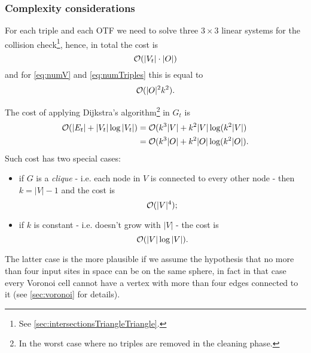 \documentclass[dissertation.tex]{subfiles}
\begin{document}
\subsubsection{Complexity considerations}
For each triple and each \ac{OTF} we need to solve three $3\times 3$
linear systems for the
collision check\footnote{See
  \cref{sec:intersectionsTriangleTriangle}.}, hence, in total
the cost is
\begin{equation*}
  \mathcal{O}(|V_t|\cdot |O|)
\end{equation*}
and for \cref{eq:numV} and \cref{eq:numTriples} this is equal to
\newcommand{\eqCostColl}{\ensuremath{\bigO(|\obsSet|^2 k^2)}}
\begin{equation}
  \label{eq:costColl}
  \eqCostColl .
\end{equation}

The cost of applying Dijkstra's algorithm\footnote{In the worst case
  where no triples are removed in the cleaning phase.} in $G_t$ is \cite{bondy}\cite{lavalle}
\newcommand{\eqCostDijkstraTriples}{\ensuremath{\bigO(k^3|\obsSet|+k^2|\obsSet|\log(k^2|\obsSet|)}}
\begin{equation}
  \label{eq:costDijkstraTriples}
  \begin{split}
    \bigO(|E_t|+|V_t|\log |V_t|) &= \bigO(k^3|V|+k^2|V|\log(k^2|V|)\\
    &= \eqCostDijkstraTriples.
  \end{split}
\end{equation}
Such cost has two special cases:
\begin{itemize}
\item if $G$ is a \emph{clique} - i.e. each
  node in $V$ is connected to every other node \cite{bondy} - then
  $k=|V|-1$ and the cost is
  \begin{equation*}
    \mathcal{O}(|V|^4);
  \end{equation*}
\item if $k$ is constant - i.e. doesn't grow with $|V|$ - the
  cost is
  \begin{equation*}
    \mathcal{O}(|V|\log|V|).
  \end{equation*}
\end{itemize}
The latter case is the more plausible if we assume the hypothesis that
no more than four input sites in space can be on the
same sphere, in fact in that case
every Voronoi cell cannot have a vertex with more than four edges
connected to it (see \cref{sec:voronoi} for details).
\end{document}
